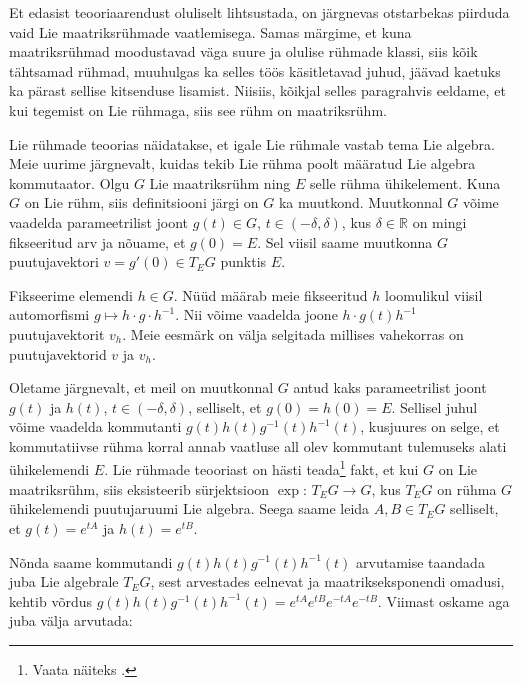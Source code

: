 \documentclass[12pt,a4paper,oneside]{article}
\theoremstyle{plain}
\theoremstyle{definition}
\numberwithin{equation}{section}
\def\R{{\mathbb R}}
\begin{document}
Et edasist teooriaarendust oluliselt lihtsustada, on järgnevas 
otstarbekas piirduda vaid Lie maatriksrühmade vaatlemisega. Samas 
märgime, et kuna maatriksrühmad moodustavad väga suure ja olulise 
rühmade klassi, siis kõik tähtsamad rühmad, muuhulgas ka selles töös 
käsitletavad juhud, jäävad kaetuks ka pärast sellise kitsenduse 
lisamist. Niisiis, kõikjal selles paragrahvis eeldame, et kui 
tegemist on Lie rühmaga, siis see rühm on maatriksrühm.

Lie rühmade teoorias näidatakse, et igale Lie rühmale vastab tema 
Lie algebra. Meie uurime järgnevalt, kuidas tekib Lie rühma poolt 
määratud Lie algebra kommutaator. Olgu $G$ Lie maatriksrühm ning $E$ 
selle rühma ühikelement. Kuna $G$ on Lie rühm, siis definitsiooni 
järgi on $G$ ka muutkond. Muutkonnal $G$ võime vaadelda 
parameetrilist joont 
$g\left(t\right) \in G$, $t \in \left(-\delta, \delta\right)$, kus 
$\delta \in \R$ on mingi fikseeritud arv ja nõuame, et 
$g\left(0\right) = E$. Sel viisil saame muutkonna $G$ puutujavektori 
$v = g'\left(0\right) \in T_E G$ punktis $E$.

Fikseerime elemendi $h \in G$. Nüüd määrab meie fikseeritud $h$ 
loomulikul viisil automorfismi $g \mapsto h \cdot g \cdot h^{-1}$. 
Nii võime vaadelda joone $h \cdot g\left(t\right) h^{-1}$ 
puutujavektorit $v_h$. Meie eesmärk on välja selgitada millises 
vahekorras on puutujavektorid $v$ ja $v_h$.

Oletame järgnevalt, et meil on muutkonnal $G$ antud kaks 
parameetrilist joont $g\left(t\right)$ ja $h\left(t\right)$, 
$t \in \left(-\delta, \delta\right)$, selliselt, et 
$g\left(0\right) = h\left(0\right) = E$. Sellisel juhul võime 
vaadelda kommutanti $g\left(t\right) h\left(t\right) 
g^{-1}\left(t\right) h^{-1}\left(t\right)$, kusjuures on selge, et 
kommutatiivse rühma korral annab vaatluse all olev kommutant 
tulemuseks alati ühikelemendi $E$. Lie rühmade teooriast on hästi 
teada\footnote{Vaata näiteks \cite[Exponential map]{Kirillov}.} fakt, 
et kui $G$ on Lie maatriksrühm, siis eksisteerib sürjektsioon 
$\exp \colon\, T_E G \rightarrow G$, kus $T_E G$ on rühma $G$ ühikelemendi 
puutujaruumi Lie algebra. Seega saame leida $A, B \in T_E G$ 
selliselt, et $g\left(t\right) = e^{tA}$ ja $h\left(t\right) = 
e^{tB}$. 

Nõnda saame kommutandi 
$g\left(t\right) h\left(t\right) g^{-1}\left(t\right) 
h^{-1}\left(t\right)$ arvutamise taandada juba Lie algebrale 
$T_E G$, sest arvestades eelnevat ja maatrikseksponendi omadusi, 
kehtib võrdus $g\left(t\right) h\left(t\right) g^{-1}\left(t\right) 
h^{-1}\left(t\right) = e^{tA} e^{tB} e^{-tA} e^{-tB}$. 
Viimast oskame aga juba välja arvutada:
\end{document}
